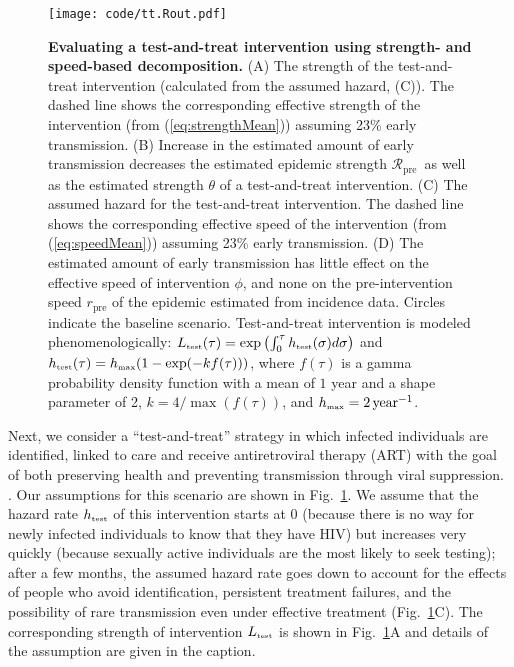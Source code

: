 \documentclass[12pt]{article}
\newcommand{\RR}{\ensuremath{{\mathcal R}}}
\newcommand{\Rx}[1]{\ensuremath{\RR_{\mathrm{#1}}}}
\newcommand{\Rpre}{\Rx{pre}}
\newcommand{\rr}{\ensuremath{{r}}}
\newcommand{\rx}[1]{\ensuremath{\rr_{\mathrm{#1}}}}
\newcommand{\rpre}{\rx{pre}}
\newcommand{\tsub}[2]{#1_{{\textrm{\tiny #2}}}}
\newcommand{\figref}[1]{Fig.~\ref{fig:#1}}
\newcommand{\figlab}[1]{\label{fig:#1}}
\renewcommand{\eqref}[1]{(\ref{eq:#1})}
\begin{document}
\begin{figure}[!t]
\texttt{[image: code/tt.Rout.pdf]}
\caption{
\textbf{Evaluating a test-and-treat intervention using strength- and speed-based decomposition.}
(A) The strength of the test-and-treat intervention (calculated from the assumed hazard, (C)). The dashed line shows the corresponding effective strength of the intervention (from \eqref{strengthMean}) assuming 23\% early transmission.
(B) Increase in the estimated amount of early transmission decreases the estimated epidemic strength \Rpre\ as well as the estimated strength $\theta$ of a test-and-treat intervention.
(C) The assumed hazard for the test-and-treat intervention. 
The dashed line shows the corresponding effective speed of the intervention (from \eqref{speedMean}) assuming 23\% early transmission.
(D) The estimated amount of early transmission has little effect on the effective speed of intervention $\phi$, and none on the pre-intervention speed $\rpre$ of the epidemic estimated from incidence data.
Circles indicate the baseline scenario.
Test-and-treat intervention is modeled phenomenologically: $\tsub{L}{test}(\tau) = \exp\left(\int_0^\tau \tsub{h}{test}(\sigma) d\sigma \right)$ and $\tsub{h}{test}(\tau) = \tsub{h}{max} (1 - \exp(- k f(\tau)))$, where $f(\tau)$ is a gamma probability density function with a mean of $1$ year and a shape parameter of 2, $k = 4/\max(f(\tau))$, and $\tsub{h}{max} = 2\,\mathrm{year}^{-1}$.
}
\figlab{test}
\end{figure}

Next, we consider a ``test-and-treat'' strategy in which infected individuals are identified, linked to care and receive antiretroviral therapy (ART) with the goal of both preserving health and preventing transmission through viral suppression. \citep{garnett2009treating, granich2009universal, nah2017test}.
Our assumptions for this scenario are shown in \figref{test}.
We assume that the hazard rate $\tsub{h}{test}$ of this intervention starts at 0 (because there is no way for newly infected individuals to know that they have HIV) but increases very quickly (because sexually active individuals are the most likely to seek testing); 
after a few months, the assumed hazard rate goes down to account for the effects of people who avoid identification, persistent treatment failures, and the possibility of rare transmission even under effective treatment (\figref{test}C). The corresponding strength of intervention $\tsub{L}{test}$ is shown in \figref{test}A and details of the assumption are given in the caption.
\end{document}
